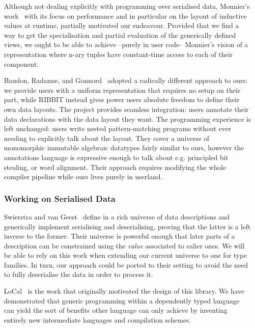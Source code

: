 Although not dealing explicitly with programming over serialised data,
Monnier's work~\citep{DBLP:conf/icfp/Monnier19} with its focus on performance and
in particular on the layout of inductive values at runtime,
partially motivated our endeavour.
%
Provided that we find a way to get the specialisation and partial evaluation
of the generically defined views, we ought to be able to achieve --purely in
user code-- Monnier's vision of a representation where n-ary tuples have
constant-time access to each of their component.

Baudon, Radanne, and Gonnord~\citep{ACM:conf/icfp/Baudon23} adopted
a radically different approach to ours: we provide users with a
uniform representation that requires no setup on their part,
while \textsc{RIBBIT} instead gives power users absolute freedom
to define their own data layouts.
%
The project provides seamless integration: users annotate their
data declarations with the data layout they want.
%
The programming experience is left unchanged: users write nested
pattern-matching programs without ever needing to explicitly talk
about the layout.
%
They cover a universe of monomorphic immutable algebraic datatypes
fairly similar to ours, however the annotations language is expressive
enough to talk about e.g. principled bit stealing, or word alignment.
%
Their approach requires modifying the whole compiler pipeline while
ours lives purely in userland.
%


\subsubsection{Working on Serialised Data}

Swierstra and van Geest~\citep{DBLP:conf/icfp/GeestS17}
define in \agda{} a rich universe of data descriptions
and generically implement serialising and deserialising,
proving that the latter is a left inverse to the former.
%
Their universe is powerful enough that later parts of a
description can be constrained using the \emph{value}
associated to ealier ones.
%
We will be able to rely on this work when extending our
current universe to one for type families.
%
In turn, our approach could be ported to their setting
to avoid the need to fully deserialise the data in order
to process it.


LoCal~\citep{DBLP:conf/pldi/VollmerKRS0N19} is the work that originally
motivated the design of this library.
%
We have demonstrated that generic programming within a dependently typed
language can yield the sort of benefits other language can only achieve
by inventing entirely new intermediate languages and compilation schemes.

